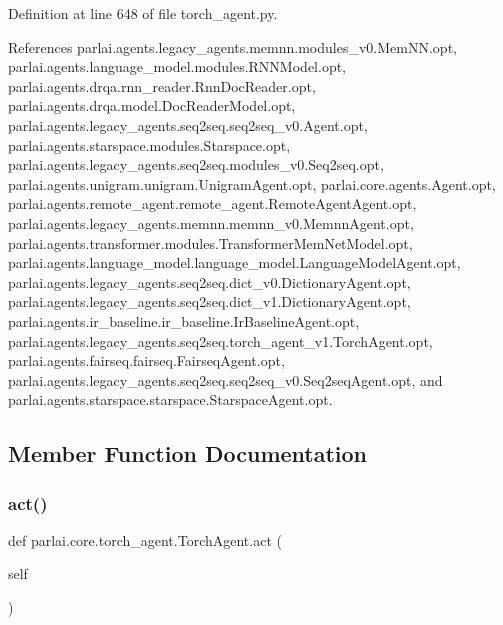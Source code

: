 Definition at line 648 of file torch\+\_\+agent.\+py.



References parlai.\+agents.\+legacy\+\_\+agents.\+memnn.\+modules\+\_\+v0.\+Mem\+N\+N.\+opt, parlai.\+agents.\+language\+\_\+model.\+modules.\+R\+N\+N\+Model.\+opt, parlai.\+agents.\+drqa.\+rnn\+\_\+reader.\+Rnn\+Doc\+Reader.\+opt, parlai.\+agents.\+drqa.\+model.\+Doc\+Reader\+Model.\+opt, parlai.\+agents.\+legacy\+\_\+agents.\+seq2seq.\+seq2seq\+\_\+v0.\+Agent.\+opt, parlai.\+agents.\+starspace.\+modules.\+Starspace.\+opt, parlai.\+agents.\+legacy\+\_\+agents.\+seq2seq.\+modules\+\_\+v0.\+Seq2seq.\+opt, parlai.\+agents.\+unigram.\+unigram.\+Unigram\+Agent.\+opt, parlai.\+core.\+agents.\+Agent.\+opt, parlai.\+agents.\+remote\+\_\+agent.\+remote\+\_\+agent.\+Remote\+Agent\+Agent.\+opt, parlai.\+agents.\+legacy\+\_\+agents.\+memnn.\+memnn\+\_\+v0.\+Memnn\+Agent.\+opt, parlai.\+agents.\+transformer.\+modules.\+Transformer\+Mem\+Net\+Model.\+opt, parlai.\+agents.\+language\+\_\+model.\+language\+\_\+model.\+Language\+Model\+Agent.\+opt, parlai.\+agents.\+legacy\+\_\+agents.\+seq2seq.\+dict\+\_\+v0.\+Dictionary\+Agent.\+opt, parlai.\+agents.\+legacy\+\_\+agents.\+seq2seq.\+dict\+\_\+v1.\+Dictionary\+Agent.\+opt, parlai.\+agents.\+ir\+\_\+baseline.\+ir\+\_\+baseline.\+Ir\+Baseline\+Agent.\+opt, parlai.\+agents.\+legacy\+\_\+agents.\+seq2seq.\+torch\+\_\+agent\+\_\+v1.\+Torch\+Agent.\+opt, parlai.\+agents.\+fairseq.\+fairseq.\+Fairseq\+Agent.\+opt, parlai.\+agents.\+legacy\+\_\+agents.\+seq2seq.\+seq2seq\+\_\+v0.\+Seq2seq\+Agent.\+opt, and parlai.\+agents.\+starspace.\+starspace.\+Starspace\+Agent.\+opt.



\subsection{Member Function Documentation}
\mbox{\label{classparlai_1_1core_1_1torch__agent_1_1TorchAgent_a51174dfa508970e3392246b02d0d94b5}} 
\subsubsection{\texorpdfstring{act()}{act()}}
{\footnotesize\ttfamily def parlai.\+core.\+torch\+\_\+agent.\+Torch\+Agent.\+act (\begin{DoxyParamCaption}\item[{}]{self }\end{DoxyParamCaption})}

